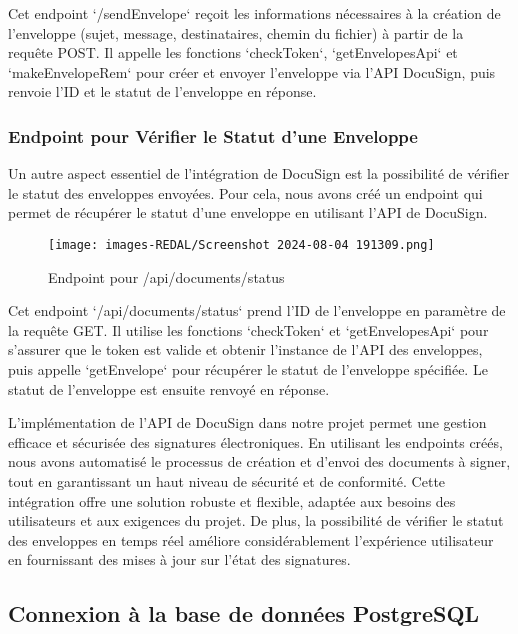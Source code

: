 Cet endpoint `/sendEnvelope` reçoit les informations nécessaires à la création de l'enveloppe (sujet, message, destinataires, chemin du fichier) à partir de la requête POST. Il appelle les fonctions `checkToken`, `getEnvelopesApi` et `makeEnvelopeRem` pour créer et envoyer l'enveloppe via l'API DocuSign, puis renvoie l'ID et le statut de l'enveloppe en réponse.

\subsubsection{Endpoint pour Vérifier le Statut d'une Enveloppe}

Un autre aspect essentiel de l'intégration de DocuSign est la possibilité de vérifier le statut des enveloppes envoyées. Pour cela, nous avons créé un endpoint qui permet de récupérer le statut d'une enveloppe en utilisant l'API de DocuSign.

\begin{figure}[H]
\begin{center}
\texttt{[image: images-REDAL/Screenshot 2024-08-04 191309.png]}
\end{center}
\caption{Endpoint pour /api/documents/status}
\end{figure}

Cet endpoint `/api/documents/status` prend l'ID de l'enveloppe en paramètre de la requête GET. Il utilise les fonctions `checkToken` et `getEnvelopesApi` pour s'assurer que le token est valide et obtenir l'instance de l'API des enveloppes, puis appelle `getEnvelope` pour récupérer le statut de l'enveloppe spécifiée. Le statut de l'enveloppe est ensuite renvoyé en réponse.


L'implémentation de l'API de DocuSign dans notre projet permet une gestion efficace et sécurisée des signatures électroniques. En utilisant les endpoints créés, nous avons automatisé le processus de création et d'envoi des documents à signer, tout en garantissant un haut niveau de sécurité et de conformité. Cette intégration offre une solution robuste et flexible, adaptée aux besoins des utilisateurs et aux exigences du projet. De plus, la possibilité de vérifier le statut des enveloppes en temps réel améliore considérablement l'expérience utilisateur en fournissant des mises à jour sur l'état des signatures.



\subsection{Connexion à la base de données PostgreSQL}
